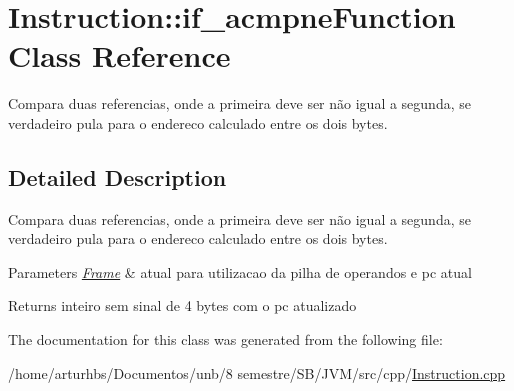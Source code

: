 \hypertarget{classInstruction_1_1if__acmpneFunction}{}\section{Instruction\+:\+:if\+\_\+acmpne\+Function Class Reference}
\label{classInstruction_1_1if__acmpneFunction}


Compara duas referencias, onde a primeira deve ser não igual a segunda, se verdadeiro pula para o endereco calculado entre os dois bytes.  




\subsection{Detailed Description}
Compara duas referencias, onde a primeira deve ser não igual a segunda, se verdadeiro pula para o endereco calculado entre os dois bytes. 


\begin{DoxyParams}{Parameters}
{\em \hyperlink{classFrame}{Frame}} & atual para utilizacao da pilha de operandos e pc atual \\
\hline
\end{DoxyParams}
\begin{DoxyReturn}{Returns}
inteiro sem sinal de 4 bytes com o pc atualizado 
\end{DoxyReturn}


The documentation for this class was generated from the following file\+:\begin{DoxyCompactItemize}
\item 
/home/arturhbs/\+Documentos/unb/8 semestre/\+S\+B/\+J\+V\+M/src/cpp/\hyperlink{Instruction_8cpp}{Instruction.\+cpp}\end{DoxyCompactItemize}
